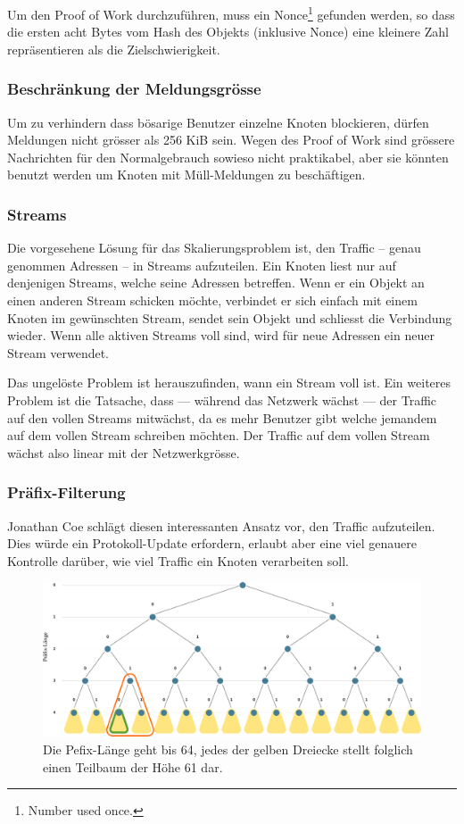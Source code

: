 \documentclass{bfh}
\begin{document}
  Um den Proof of Work durchzuführen, muss ein Nonce\footnote{Number used once.} gefunden werden, so dass die ersten acht Bytes vom Hash des Objekts (inklusive Nonce) eine kleinere Zahl repräsentieren als die Zielschwierigkeit.

  \subsubsection{Beschränkung der Meldungsgrösse}
  Um zu verhindern dass bösarige Benutzer einzelne Knoten blockieren, dürfen Meldungen nicht grösser als 256 KiB sein. Wegen des Proof of Work sind grössere Nachrichten für den Normalgebrauch sowieso nicht praktikabel, aber sie könnten benutzt werden um Knoten mit Müll-Meldungen zu beschäftigen.

  \subsubsection{Streams}
  Die vorgesehene Lösung für das Skalierungsproblem ist, den Traffic -- genau genommen Adressen -- in Streams aufzuteilen. Ein Knoten liest nur auf denjenigen Streams, welche seine Adressen betreffen. Wenn er ein Objekt an einen anderen Stream schicken möchte, verbindet er sich einfach mit einem Knoten im gewünschten Stream, sendet sein Objekt und schliesst die Verbindung wieder. Wenn alle aktiven Streams voll sind, wird für neue Adressen ein neuer Stream verwendet.

  Das ungelöste Problem ist herauszufinden, wann ein Stream voll ist. Ein weiteres Problem ist die Tatsache, dass --- während das Netzwerk wächst --- der Traffic auf den vollen Streams mitwächst, da es mehr Benutzer gibt welche jemandem auf dem vollen Stream schreiben möchten. Der Traffic auf dem vollen Stream wächst also linear mit der Netzwerkgrösse.

  \subsubsection{Präfix-Filterung}
  Jonathan Coe schlägt diesen interessanten Ansatz vor, den Traffic aufzuteilen. Dies würde ein Protokoll-Update erfordern, erlaubt aber eine viel genauere Kontrolle darüber, wie viel Traffic ein Knoten verarbeiten soll.\cite{wiki:prefixfilter}

  \begin{figure}[h]
  \centering
  \includegraphics[width=\textwidth]{images/prefix-filter-binary-tree.pdf}
  \caption[Präfix-Filter: Binärbaum]{Die Pefix-Länge geht bis 64, jedes der gelben Dreiecke stellt folglich einen Teilbaum der Höhe 61 dar.}
  \label{fig:bintree}
  \end{figure}
\end{document}
